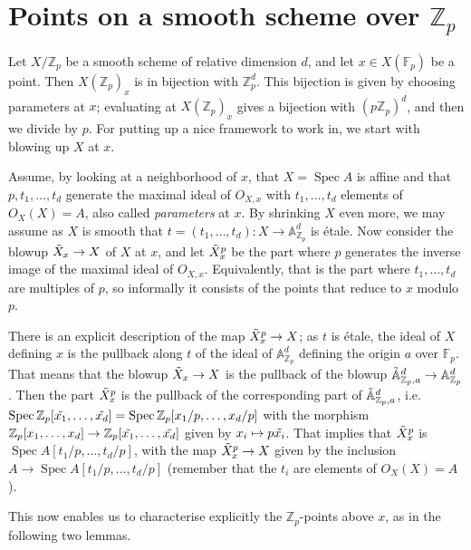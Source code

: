 \documentclass[12pt]{article}
\newcommand{\A}{\mathbb{A}}
\newcommand{\Z}{\mathbb{Z}}
\newcommand{\F}{\mathbb{F}}
\DeclareMathOperator{\Spec}{Spec}
\theoremstyle{plain}
\theoremstyle{definition}
\theoremstyle{remark}
\begin{document}
\newpage
\section{Points on a smooth scheme over \texorpdfstring{$\Z_p$}{Z\_p}}
\label{section:smoothzppoints}
Let $X/\Z_p$ be a smooth scheme of relative dimension $d$, and let $x \in X(\F_p)$ be a point. Then $X(\Z_p)_x$ is in bijection with $\Z_p^d$. This bijection is given by choosing parameters at $x$; evaluating at $X(\Z_p)_x$ gives a bijection with $(p\Z_p)^d$, and then we divide by $p$. For putting up a nice framework to work in, we start with blowing up $X$ at $x$.

Assume, by looking at a neighborhood of $x$, that $X = \Spec A$ is affine and that $p,t_1,\dots,t_d$ generate the maximal ideal of $O_{X,x}$ with $t_1,\dots,t_d$ elements of $O_X(X) = A$, also called \textit{parameters} at $x$. By shrinking $X$ even more, we may assume as $X$ is smooth that $t = (t_1,\dots,t_d): X \to \A^d_{\Z_p}$ is \'etale. Now consider the blowup $\Tilde{X}_x \to X$ of $X$ at $x$, and let $\Tilde{X}_x^p$ be the part where $p$ generates the inverse image of the maximal ideal of $O_{X,x}$. Equivalently, that is the part where $t_1,\dots,t_d$ are multiples of $p$, so informally it consists of the points that reduce to $x$ modulo $p$.

There is an explicit description of the map $\Tilde{X}_x^p \to X$; as $t$ is \'etale, the ideal of $X$ defining $x$ is the pullback along $t$ of the ideal of $\A^d_{\Z_p}$ defining the origin $a$ over $\F_p$. That means that the blowup $\Tilde{X}_x \to X$ is the pullback of the blowup $\Tilde{\A}^d_{\Z_p,a} \to \A_{\Z_p}^d$. Then the part $\Tilde{X}_x^p$ is the pullback of the corresponding part of $\Tilde{\A}^d_{\Z_p,a}$, i.e. $\Spec \Z_p[\Tilde{x_1},\dots,\Tilde{x_d}] = \Spec \Z_p[x_1/p,\dots,x_d/p]$ with the morphism $\Z_p[x_1,\dots,x_d] \to \Z_p[\Tilde{x_1},\dots,\tilde{x_d}]$ given by $x_i \mapsto p\Tilde{x_i}$. That implies that $\Tilde{X}_x^p$ is $\Spec A[t_1/p,\dots,t_d/p]$, with the map $\Tilde{X}_x^p \to X$ given by the inclusion $A \to \Spec A[t_1/p,\dots,t_d/p]$ (remember that the $t_i$ are elements of $O_X(X) = A$).

This now enables us to characterise explicitly the $\Z_p$-points above $x$, as in the following two lemmas.
\end{document}
